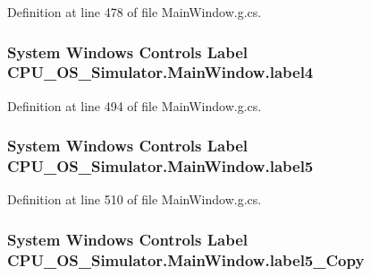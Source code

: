 Definition at line 478 of file Main\+Window.\+g.\+cs.

\hypertarget{class_c_p_u___o_s___simulator_1_1_main_window_a3473dc873d8c8d8f4bba6e83f5684299}{}
\subsubsection[{label4}]{\setlength{\rightskip}{0pt plus 5cm}System Windows Controls Label C\+P\+U\+\_\+\+O\+S\+\_\+\+Simulator.\+Main\+Window.\+label4\hspace{0.3cm}{\ttfamily [package]}}\label{class_c_p_u___o_s___simulator_1_1_main_window_a3473dc873d8c8d8f4bba6e83f5684299}


Definition at line 494 of file Main\+Window.\+g.\+cs.

\hypertarget{class_c_p_u___o_s___simulator_1_1_main_window_a37b18e7542e985a8984375d0b1cf441e}{}
\subsubsection[{label5}]{\setlength{\rightskip}{0pt plus 5cm}System Windows Controls Label C\+P\+U\+\_\+\+O\+S\+\_\+\+Simulator.\+Main\+Window.\+label5\hspace{0.3cm}{\ttfamily [package]}}\label{class_c_p_u___o_s___simulator_1_1_main_window_a37b18e7542e985a8984375d0b1cf441e}


Definition at line 510 of file Main\+Window.\+g.\+cs.

\hypertarget{class_c_p_u___o_s___simulator_1_1_main_window_aadfe7782d7e25b730849222805a541f9}{}
\subsubsection[{label5\+\_\+\+Copy}]{\setlength{\rightskip}{0pt plus 5cm}System Windows Controls Label C\+P\+U\+\_\+\+O\+S\+\_\+\+Simulator.\+Main\+Window.\+label5\+\_\+\+Copy\hspace{0.3cm}{\ttfamily [package]}}\label{class_c_p_u___o_s___simulator_1_1_main_window_aadfe7782d7e25b730849222805a541f9}


